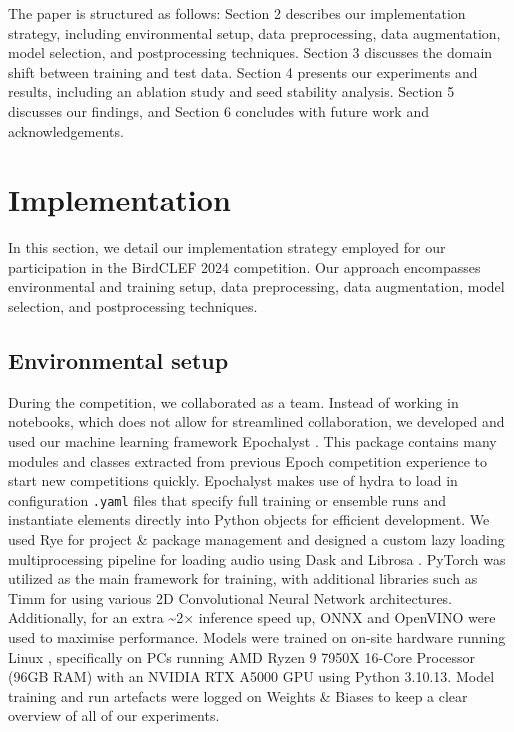 \documentclass[
]{ceurart}
\begin{document}
The paper is structured as follows: Section 2 describes our implementation strategy, including environmental setup, data preprocessing, data augmentation, model selection, and postprocessing techniques. Section 3 discusses the domain shift between training and test data. Section 4 presents our experiments and results, including an ablation study and seed stability analysis. Section 5 discusses our findings, and Section 6 concludes with future work and acknowledgements.

\section{Implementation} \label{implementation} %
In this section, we detail our implementation strategy employed for our participation in the BirdCLEF 2024 competition. Our approach encompasses environmental and training setup, data preprocessing, data augmentation, model selection, and postprocessing techniques.

\subsection{Environmental setup} \label{environmental-setup}
During the competition, we collaborated as a team. Instead of working in notebooks, which does not allow for streamlined collaboration, we developed and used our machine learning framework Epochalyst \cite{epoch2024epochalyst}. This package contains many modules and classes extracted from previous Epoch \cite{TeamEpoch} competition experience to start new competitions quickly. Epochalyst makes use of hydra to load in configuration \texttt{.yaml} files that specify full training or ensemble runs and instantiate elements directly into Python objects for efficient development. We used Rye \cite{ronacher2024rye} for project \& package management and designed a custom lazy loading multiprocessing pipeline for loading audio using Dask \cite{dask2024} and Librosa \cite{librosa}. PyTorch \cite{pytorch} was utilized as the main framework for training, with additional libraries such as Timm \cite{timm} for using various 2D Convolutional Neural Network architectures. Additionally, for an extra \textasciitilde 2× inference speed up, ONNX \cite{onnx} and OpenVINO \cite{openvino} were used to maximise performance. Models were trained on on-site hardware running Linux \cite{ubuntu}, specifically on PCs running AMD Ryzen 9 7950X 16-Core Processor (96GB RAM) with an NVIDIA RTX A5000 GPU using Python 3.10.13. Model training and run artefacts were logged on Weights \& Biases \cite{wandb} to keep a clear overview of all of our experiments.
\end{document}

